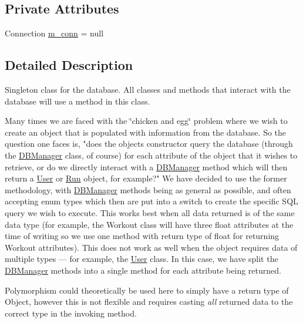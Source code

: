\subsection*{Private Attributes}
\begin{DoxyCompactItemize}
\item 
Connection \hyperlink{classcom_1_1activitytracker_1_1_d_b_manager_a064088d13ac09eb147fdc19268771521}{m\+\_\+conn} = null
\end{DoxyCompactItemize}


\subsection{Detailed Description}
Singleton class for the database. All classes and methods that interact with the database will use a method in this class.

Many times we are faced with the \char`\"{}chicken and egg\char`\"{} problem where we wish to create an object that is populated with information from the database. So the question one faces is, "does the object\textquotesingle{}s constructor query the database (through the \hyperlink{classcom_1_1activitytracker_1_1_d_b_manager}{D\+B\+Manager} class, of course) for each attribute of the object that it wishes to retrieve, or do we directly interact with a \hyperlink{classcom_1_1activitytracker_1_1_d_b_manager}{D\+B\+Manager} method which will then return a \hyperlink{classcom_1_1activitytracker_1_1_user}{User} or \hyperlink{classcom_1_1activitytracker_1_1_run}{Run} object, for example?" We have decided to use the former methodology, with \hyperlink{classcom_1_1activitytracker_1_1_d_b_manager}{D\+B\+Manager} methods being as general as possible, and often accepting enum types which then are put into a switch to create the specific S\+QL query we wish to execute. This works best when all data returned is of the same data type (for example, the Workout class will have three float attributes at the time of writing so we use one method with return type of float for returning Workout attributes). This does not work as well when the object requires data of multiple types --- for example, the \hyperlink{classcom_1_1activitytracker_1_1_user}{User} class. In this case, we have split the \hyperlink{classcom_1_1activitytracker_1_1_d_b_manager}{D\+B\+Manager} methods into a single method for each attribute being returned.

Polymorphism could theoretically be used here to simply have a return type of Object, however this is not flexible and requires casting {\itshape all} returned data to the correct type in the invoking method. 

